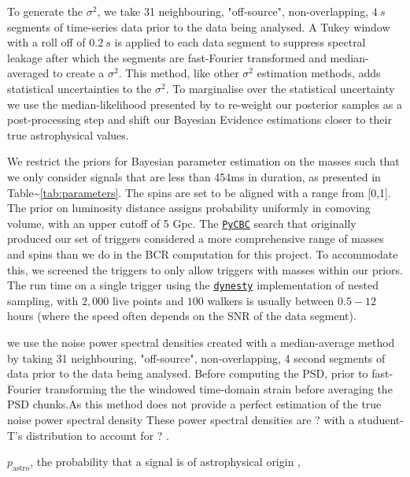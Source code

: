 \documentclass[%
 reprint,
 amsmath,amssymb,
 aps,
]{revtex4}
\newcommand{\psd}{{\sc $\sigma^2$}\xspace}
\newcommand{\pastro}{{$p_\text{astro}$}\xspace}
\begin{document}
To generate the \psd, we take 31 neighbouring, "off-source", non-overlapping,  $4\ s$  segments of time-series data prior to the data being analysed. A Tukey window with a roll off of $0.2\ s$ is applied to each data segment to suppress spectral leakage after which the segments are fast-Fourier transformed and median-averaged to create a \psd. This method, like other \psd estimation methods, adds statistical uncertainties to the \psd \cite{psd_student_t}.  To marginalise over the statistical uncertainty we use the median-likelihood presented by \citet{psd_student_t} to re-weight our posterior samples as a post-processing step and shift our Bayesian Evidence estimations closer to their true astrophysical values. 

We restrict the priors for Bayesian parameter estimation on the masses such that we only consider signals that are less
than 454ms in duration, as presented in Table\textasciitilde\ref{tab:parameters}. The spins are set to be aligned with a range from
{[}0,1{]}. The prior on luminosity distance assigns probability uniformly in comoving volume, with an upper cutoff of 5 Gpc.
The \href{https://pycbc.org/}{\texttt{PyCBC}} search that originally produced our set of triggers considered a more comprehensive range of masses and
spins than we do in the BCR computation for this project. To accommodate this, we screened the triggers to only allow
triggers with masses within our priors. The run time on a single trigger using the \href{https://arxiv.org/abs/1904.02180}{\texttt{dynesty}} implementation of nested
sampling, with \(2,000\) live points and \(100\) walkers is usually between \(0.5-12\) hours (where the speed often depends on
the SNR of the data segment).


 




we use the noise power spectral densities created with a median-average method by taking 31 neighbouring, "off-source", non-overlapping,  4 second segments of data prior to the data being analysed. Before computing the PSD,   prior to fast-Fourier transforming the the windowed time-domain strain before averaging the PSD chunks.As this method does not provide a perfect estimation of the true noise power spectral density  These power spectral densities are ? with a studuent-T's distribution to account for ? \cite{psd_student_t}. 


\pastro, the probability that a signal is of astrophysical origin \cite{pastro_1,pastro_2,pastro_3},
\end{document}
